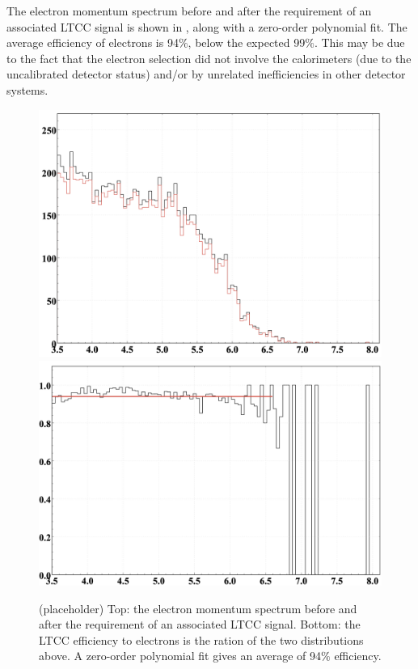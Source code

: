 The electron momentum spectrum before and after the requirement of an associated LTCC signal is shown in ,
along with a zero-order polynomial fit. The average efficiency of electrons is 94$\%$, below the expected 99$\%$.
This may be due to the fact that the electron selection did not involve the calorimeters (due to the uncalibrated detector status)
and/or by unrelated inefficiencies in other detector systems.

\begin{figure}
	\centering
	\includegraphics[width=0.98\columnwidth,keepaspectratio]{img/electronMomenta.png}
	\includegraphics[width=0.98\columnwidth,keepaspectratio]{img/electronEfficiency.png}
	\caption{(placeholder) Top: the electron momentum spectrum before and after the requirement of an associated LTCC signal.
								  Bottom: the LTCC efficiency to electrons is the ration of the two distributions above.
								  A zero-order polynomial fit gives an average of 94$\%$ efficiency. }
	\label{fig:electronEfficiency}
\end{figure}

